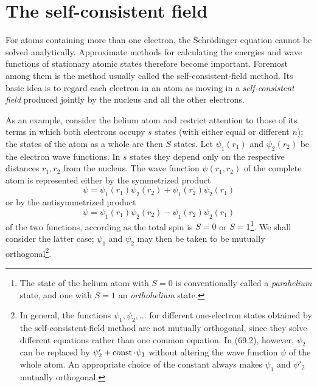 \section{The self-consistent field}

For atoms containing more than one electron, the Schrödinger equation cannot be solved analytically. Approximate methods for calculating the energies and wave functions of stationary atomic states therefore become important. Foremost among them is the method usually called the self-consistent-field method. Its basic idea is to regard each electron in an atom as moving in a \emph{self-consistent field} produced jointly by the nucleus and all the other electrons.

As an example, consider the helium atom and restrict attention to those of its terms in which both electrons occupy $s$ states (with either equal or different $n$); the states of the atom as a whole are then $S$ states. Let $\psi_1(r_1)$ and $\psi_2(r_2)$ be the electron wave functions. In $s$ states they depend only on the respective distances $r_1,r_2$ from the nucleus. The wave function $\psi(r_1,r_2)$ of the complete atom is represented either by the symmetrized product
\begin{equation}
 \psi=\psi_1(r_1)\psi_2(r_2)+\psi_1(r_2)\psi_2(r_1)
 \tag{69.1}
\end{equation}
or by the antisymmetrized product
\begin{equation}
 \psi=\psi_1(r_1)\psi_2(r_2)-\psi_1(r_2)\psi_2(r_1)
 \tag{69.2}
\end{equation}
of the two functions, according as the total spin is $S=0$ or $S=1$\footnote{The state of the helium atom with $S=0$ is conventionally called a \emph{parahelium} state, and one with $S=1$ an \emph{orthohelium} state.}. We shall consider the latter case; $\psi_1$ and $\psi_2$ may then be taken to be mutually orthogonal\footnote{In general, the functions $\psi_1,\psi_2,\ldots$ for different one-electron states obtained by the self-consistent-field method are not mutually orthogonal, since they solve different equations rather than one common equation. In (69.2), however, $\psi_2$ can be replaced by $\psi'_2+\mathop{\rm const}\cdot\psi_1$ without altering the wave function $\psi$ of the whole atom. An appropriate choice of the constant always makes $\psi_1$ and $\psi'_2$ mutually orthogonal.}.



